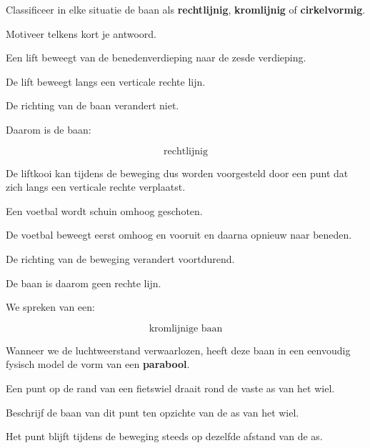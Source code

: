 \documentclass{ximera}
\begin{document}
\begin{oefening}{\oefB}

  Classificeer in elke situatie de baan als \textbf{rechtlijnig},
  \textbf{kromlijnig} of \textbf{cirkelvormig}.
  
  Motiveer telkens kort je antwoord.
  
  \begin{question}
  Een lift beweegt van de benedenverdieping naar de zesde verdieping.
  
  \begin{oplossing}
  De lift beweegt langs een verticale rechte lijn.
  
  De richting van de baan verandert niet.
  
  Daarom is de baan:
  
  \[
  \boxed{\text{rechtlijnig}}
  \]
  
  De liftkooi kan tijdens de beweging dus worden voorgesteld door een punt dat
  zich langs een verticale rechte verplaatst.
  \end{oplossing}
  \end{question}
  
  
  \begin{question}
  Een voetbal wordt schuin omhoog geschoten.
  
  \begin{oplossing}
  De voetbal beweegt eerst omhoog en vooruit en daarna opnieuw naar beneden.
  
  De richting van de beweging verandert voortdurend.
  
  De baan is daarom geen rechte lijn.
  
  We spreken van een:
  
  \[
  \boxed{\text{kromlijnige baan}}
  \]
  
  Wanneer we de luchtweerstand verwaarlozen, heeft deze baan in een eenvoudig
  fysisch model de vorm van een \textbf{parabool}.
  \end{oplossing}
  \end{question}
  
  
  \begin{question}
  Een punt op de rand van een fietswiel draait rond de vaste as van het wiel.
  
  Beschrijf de baan van dit punt ten opzichte van de as van het wiel.
  
  \begin{oplossing}
  Het punt blijft tijdens de beweging steeds op dezelfde afstand van de as.
  

\end{oplossing}
\end{question}
\end{oefening}
\end{document}
